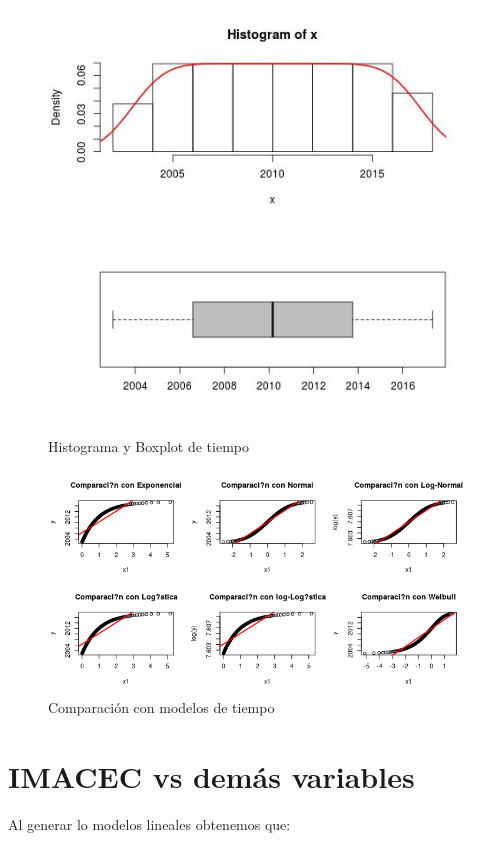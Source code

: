 \documentclass{article}
\begin{document}
\begin{figure}[h!]
\centering
\includegraphics[scale=0.5]{./plots/histplot_tiempo.png}
\caption{Histograma y Boxplot de tiempo}
\end{figure}

\begin{figure}[h!]
\centering
\includegraphics[scale=0.5]{./plots/cm_tiempo.png}
\caption{Comparación con modelos de tiempo}
\end{figure}
\pagebreak
\section*{IMACEC vs demás variables}
Al generar lo modelos lineales obtenemos que:
\end{document}
